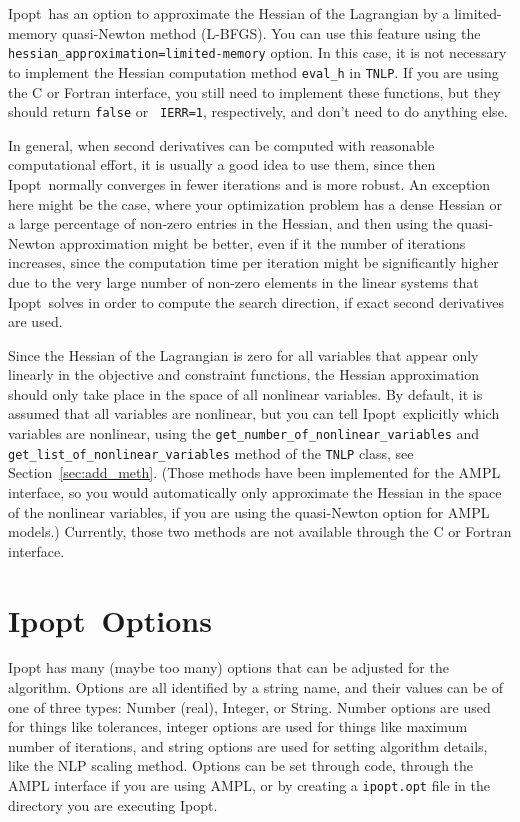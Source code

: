 \documentclass[10pt]{article}
\newcommand{\Ipopt}{{\sc Ipopt}}
\begin{document}
\Ipopt\ has an option to approximate the Hessian of the Lagrangian by
a limited-memory quasi-Newton method (L-BFGS).  You can use this
feature using the {\tt hessian\_approximation=limited-memory} option.  In this case, it is not necessary to
implement the Hessian computation method {\tt eval\_h} in {\tt TNLP}.
If you are using the C or Fortran interface, you still need to
implement these functions, but they should return {\tt false} or {\tt
  IERR=1}, respectively, and don't need to do anything else.

In general, when second derivatives can be computed with reasonable
computational effort, it is usually a good idea to use them, since
then \Ipopt\ normally converges in fewer iterations and is more
robust.  An exception here might be the case, where your optimization
problem has a dense Hessian or a large percentage of non-zero entries
in the Hessian, and then using the quasi-Newton approximation might be
better, even if it the number of iterations increases, since the
computation time per iteration might be significantly higher due to
the very large number of non-zero elements in the linear systems that
\Ipopt\ solves in order to compute the search direction, if exact
second derivatives are used.

Since the Hessian of the Lagrangian is zero for all variables that
appear only linearly in the objective and constraint functions, the
Hessian approximation should only take place in the space of all
nonlinear variables.  By default, it is assumed that all variables are
nonlinear, but you can tell \Ipopt\ explicitly which variables are
nonlinear, using the {\tt get\_number\_of\_nonlinear\_variables} and
{\tt get\_list\_of\_nonlinear\_variables} method of the {\tt TNLP}
class, see Section~\ref{sec:add_meth}.  (Those methods have been
implemented for the AMPL interface, so you would automatically only
approximate the Hessian in the space of the nonlinear variables, if
you are using the quasi-Newton option for AMPL models.)  Currently,
those two methods are not available through the C or Fortran
interface.

\section{\Ipopt\ Options}\label{sec:options}
Ipopt has many (maybe too many) options that can be adjusted for the
algorithm.  Options are all identified by a string name, and their
values can be of one of three types: Number (real), Integer, or
String. Number options are used for things like tolerances, integer
options are used for things like maximum number of iterations, and
string options are used for setting algorithm details, like the NLP
scaling method. Options can be set through code, through the AMPL
interface if you are using AMPL, or by creating a {\tt ipopt.opt}
file in the directory you are executing \Ipopt.
\end{document}
